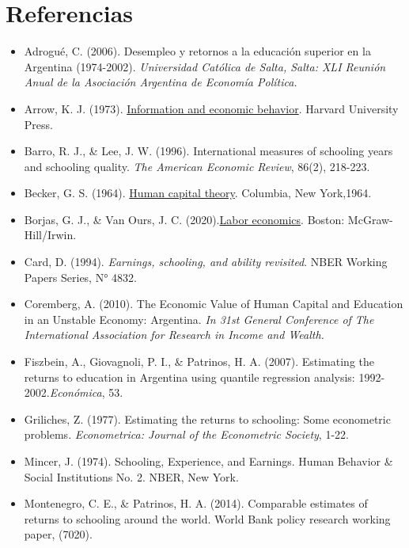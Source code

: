 \documentclass[a4paper]{article}
\theoremstyle{plain}
\theoremstyle{definition}
\begin{document}
\section{Referencias}
\begin{itemize}
    \item Adrogué, C. (2006). Desempleo y retornos a la educación superior en la Argentina (1974-2002). \textit{Universidad Católica de Salta, Salta: XLI Reunión Anual de la Asociación Argentina de Economía Política.}
    
    \item Arrow, K. J. (1973). \underline{Information and economic behavior}. Harvard University Press.

    \item Barro, R. J., \& Lee, J. W. (1996). International measures of schooling years and schooling quality. \textit{The American Economic Review}, 86(2), 218-223.

    \item Becker, G. S. (1964). \underline{Human capital theory}. Columbia, New York,1964.

    \item Borjas, G. J., \& Van Ours, J. C. (2020).\underline{Labor economics}. Boston: McGraw-Hill/Irwin.

    \item Card, D. (1994). \textit{Earnings, schooling, and ability revisited}. NBER Working Papers Series, N° 4832.

    \item Coremberg, A. (2010). The Economic Value of Human Capital and Education in an Unstable Economy: Argentina. \textit{In 31st General Conference of The International Association for Research in Income and Wealth.}
    
    \item Fiszbein, A., Giovagnoli, P. I., \& Patrinos, H. A. (2007). Estimating the returns to education in Argentina using quantile regression analysis: 1992-2002.\textit{Económica}, 53.
    
    \item Griliches, Z. (1977). Estimating the returns to schooling: Some econometric problems. \textit{Econometrica: Journal of the Econometric Society}, 1-22.

    \item Mincer, J. (1974). Schooling, Experience, and Earnings. Human Behavior \& Social Institutions No. 2. NBER, New York.

    \item Montenegro, C. E., \& Patrinos, H. A. (2014). Comparable estimates of returns to schooling around the world. World Bank policy research working paper, (7020).


\end{itemize}
\end{document}
